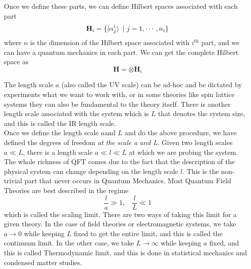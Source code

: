 \documentclass[11pt]{article}
\renewcommand{\a}[1]{a_\mathbf{#1}}
\numberwithin{equation}{section}
\begin{document}
\begin{figure}[h]
    \centering 
\end{figure}
Once we define these parts, we can define Hilbert spaces associated with each part 
\begin{equation*}
    \mathbf{H}_i = \{\ket{\alpha^i_j} ~|~ j = 1,\cdots, n_i  \}
\end{equation*}
where \(n\) is the dimension of the Hilbert space associated with \(i^{\text{th}}\) part, and we can have a quantum mechanics in each part. We can get the complete Hilbert space as 
\begin{equation*}
    \mathbf{H} = \otimes \mathbf{H}_i
\end{equation*}

The length scale \(a\) (also called the UV scale) can be ad-hoc and be dictated by experiments what we want to work with, or in some theories like spin lattice systems they can also be fundamental to the theory itself. There is another length scale associated with the system which is \(L\) that denotes the system size, and this is called the IR length scale.\\

Once we define the length scale \(a\)and \(L\) and do the above procedure, we have defined the degrees of freedom \textit{at the scale a and L}. Given two length scales \(a\ll L\), there is a length scale \(a\ll l \ll L\) at which we are probing the system. The whole richness of QFT comes due to the fact that the description of the physical system can change depending on the length scale \(l\). This is the non-trivial part that never occurs in Quantum Mechanics. Most Quantum Field Theories are best described in the regime 
\begin{equation*}
    \frac{l}{a} \gg 1,~~~~\frac{l}{L}\ll 1
\end{equation*}
which is called the scaling limit. There are two ways of taking this limit for a given theory. In the case of field theories or electromagnetic systems, we take \(a\to 0\) while keeping \(L\) fixed to get the entire limit, and this is called the continuum limit. In the other case, we take \(L\to \infty\) while keeping \(a\) fixed, and this is called Thermodynamic limit, and this is done in statistical mechanics and condensed matter studies.\\
\end{document}
